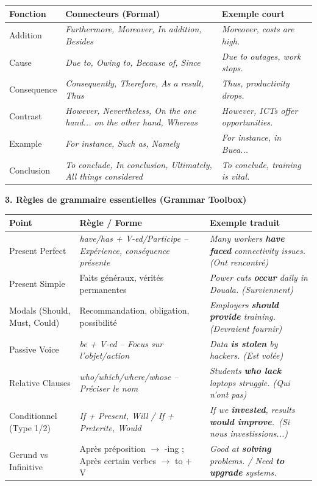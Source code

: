 \documentclass[11pt]{article}
\newcommand{\cle}[1]{{\popxbold\color{popdark}#1}}
\newcommand{\eng}[1]{\ifmmode\text{\textit{#1}}\else\begingroup\selectlanguage{english}\itshape #1\endgroup\fi}
\begin{document}
\begin{bilan}
\begin{center}
\begin{tabularx}{\linewidth}{|X|X|X|}
\hline
\rowcolor{poporangeL}
\textbf{Fonction} & \textbf{Connecteurs (Formal)} & \textbf{Exemple court} \\
\hline
Addition & \eng{Furthermore, Moreover, In addition, Besides} & \eng{Moreover, costs are high.} \\
Cause & \eng{Due to, Owing to, Because of, Since} & \eng{Due to outages, work stops.} \\
Consequence & \eng{Consequently, Therefore, As a result, Thus} & \eng{Thus, productivity drops.} \\
Contrast & \eng{However, Nevertheless, On the one hand... on the other hand, Whereas} & \eng{However, ICTs offer opportunities.} \\
Example & \eng{For instance, Such as, Namely} & \eng{For instance, in Buea...} \\
Conclusion & \eng{To conclude, In conclusion, Ultimately, All things considered} & \eng{To conclude, training is vital.} \\
\hline
\end{tabularx}
\end{center}

\vspace{0.5em}
\textbf{3. Règles de grammaire essentielles (Grammar Toolbox)}

\begin{center}
\begin{tabularx}{\linewidth}{|X|X|X|}
\hline
\rowcolor{popgreenL}
\textbf{Point} & \textbf{Règle / Forme} & \textbf{Exemple traduit} \\
\hline
\cle{Present Perfect} & \eng{have/has + V-ed/Participe} -- Expérience, conséquence présente & \eng{Many workers \textbf{have faced} connectivity issues.} (Ont rencontré) \\
\cle{Present Simple} & Faits généraux, vérités permanentes & \eng{Power cuts \textbf{occur} daily in Douala.} (Surviennent) \\
\cle{Modals (Should, Must, Could)} & Recommandation, obligation, possibilité & \eng{Employers \textbf{should provide} training.} (Devraient fournir) \\
\cle{Passive Voice} & \eng{be + V-ed} -- Focus sur l'objet/action & \eng{Data \textbf{is stolen} by hackers.} (Est volée) \\
\cle{Relative Clauses} & \eng{who/which/where/whose} -- Préciser le nom & \eng{Students \textbf{who lack} laptops struggle.} (Qui n'ont pas) \\
\cle{Conditionnel (Type 1/2)} & \eng{If + Present, Will} / \eng{If + Preterite, Would} & \eng{If we \textbf{invested}, results \textbf{would improve}}.\ (Si nous investissions...) \\
\cle{Gerund vs Infinitive} & Après préposition $\to$ \cle{-ing} ; Après certain verbes $\to$ \cle{to + V} & \eng{Good at \textbf{solving} problems.} / \eng{Need \textbf{to upgrade} systems.} \\
\hline
\end{tabularx}
\end{center}


\end{bilan}
\end{document}
